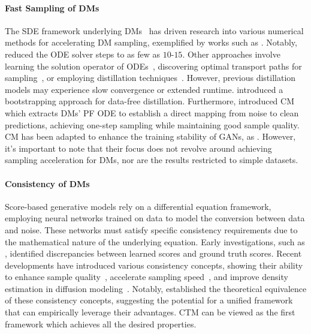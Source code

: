 \documentclass{article} \usepackage{iclr2024_coNFErence,times}
\theoremstyle{definition}
\theoremstyle{remark}
\begin{document}
\paragraph{Fast Sampling of DMs} The SDE framework underlying DMs~\citep{song2020score} has driven research into various numerical methods for accelerating DM sampling, exemplified by works such as \citep{song2020denoising,zhang2022fast,lu2022dpm}. Notably, \citep{lu2022dpm} reduced the ODE solver steps to as few as $10$-$15$. Other approaches involve learning the solution operator of ODEs~\citep{zheng2023fast}, discovering optimal transport paths for sampling~\citep{liu2022flow}, or employing distillation techniques~\citep{luhman2021knowledge,salimans2021progressive,berthelot2023tract,shao2023catch}. However, previous distillation models may experience slow convergence or extended runtime.
\citet{gu2023boot} introduced a bootstrapping approach for data-free distillation. Furthermore, \citet{song2023consistency} introduced CM which extracts DMs' PF ODE to establish a direct mapping from noise to clean predictions, achieving one-step sampling while maintaining good sample quality. CM has been adapted to enhance the training stability of GANs, as \citep{lu2023cm}. However, it's important to note that their focus does not revolve around achieving sampling acceleration for DMs, nor are the results restricted to simple datasets.


\paragraph{Consistency of DMs} Score-based generative models rely on a differential equation framework, employing neural networks trained on data to model the conversion between data and noise. These networks must satisfy specific consistency requirements due to the mathematical nature of the underlying equation. Early investigations, such as \citep{kim2022soft}, identified discrepancies between learned scores and ground truth scores. Recent developments have introduced various consistency concepts, showing their ability to enhance sample quality~\citep{daras2023consistent,li2023diffusion}, accelerate sampling speed~\citep{song2023consistency}, and improve density estimation in diffusion modeling~\citep{lai2023fp}. Notably, \citet{lai2023equivalence} established the theoretical equivalence of these consistency concepts, suggesting the potential for a unified framework that can empirically leverage their advantages. CTM can be viewed as the first framework which achieves all the desired properties.
\end{document}
